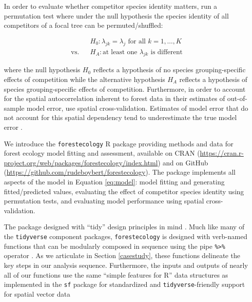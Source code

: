 \documentclass[12pt]{article}
\begin{document}
In order to evaluate whether competitor species identity matters,
\citet{allen_permutation_2020} run a permutation test where under the
null hypothesis the species identity of all competitors of a focal tree
can be permuted/shuffled:

\begin{eqnarray}
\label{eq:permutation-hypothesis-test}
&&H_0: \lambda_{jk} = \lambda_{j} \mbox{ for all } k = 1, \ldots, K\\
\text{vs.}&&H_A: \text{at least one } \lambda_{jk} \mbox{ is different}
\end{eqnarray}

where the null hypothesis \(H_0\) reflects a hypothesis of no species
grouping-specific effects of competition while the alternative
hypothesis \(H_A\) reflects a hypothesis of species grouping-specific
effects of competition. Furthermore, in order to account for the spatial
autocorrelation inherent to forest data in their estimates of
out-of-sample model error, \citet{allen_permutation_2020} use spatial
cross-validation. Estimates of model error that do not account for this
spatial dependency tend to underestimate the true model error
\citep{roberts_cross-validation_2017}.

We introduce the \texttt{forestecology} R package providing methods and
data for forest ecology model fitting and assessment, available on CRAN
(\url{https://cran.r-project.org/web/packages/forestecology/index.html})
and on GitHub (\url{https://github.com/rudeboybert/forestecology}). The
package implements all aspects of the model in Equation \ref{eq:model}:
model fitting and generating fitted/predicted values, evaluating the
effect of competitor species identity using permutation tests, and
evaluating model performance using spatial cross-validation.

The package designed with ``tidy'' design principles in mind
\citep{wickham_welcome_2019}. Much like many of the \texttt{tidyverse}
component packages, \texttt{forestecology} is designed with verb-named
functions that can be modularly composed in sequence using the pipe
\texttt{\%\textgreater{}\%} operator \citep{bache_pipe_2020}. As we
articulate in Section \ref{casestudy}, these functions delineate the key
steps in our analysis sequence. Furthermore, the inputs and outputs of
nearly all of our functions use the same ``simple features for R'' data
structures as implemented in the \texttt{sf} package for standardized
and \texttt{tidyverse}-friendly support for spatial vector data
\citep{pebesma_simple_2018}
\end{document}
